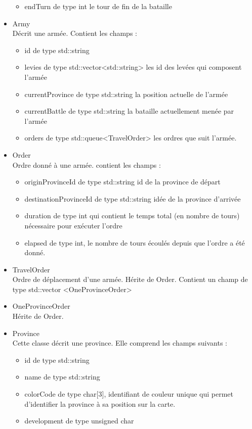 \documentclass[a4paper,12pt]{article}
\begin{document}
\begin{itemize}
\begin{itemize}
\item endTurn de type int le tour de fin de la bataille
\end{itemize}
\item Army\\
Décrit une armée. Contient les champs : 
\begin{itemize}
\item id de type std::string
\item levies de type std::vector<std::string> les id des levées qui composent l'armée
\item currentProvince de type std::string la position actuelle de l'armée
\item currentBattle de type std::string la bataille actuellement menée par l'armée
\item orders de type std::queue<TravelOrder> les ordres que suit l'armée.
\end{itemize}
\item Order\\
Ordre donné à une armée. contient les champs :
\begin{itemize}
 \item originProvinceId de type std::string id de la province de départ
 \item destinationProvinceId de type std::string idée de la province d'arrivée
 \item duration de type int qui contient le temps total (en nombre de tours) nécessaire pour exécuter l'ordre
 \item elapsed de type int, le nombre de tours écoulés depuis que l'ordre a été donné.
 \end{itemize}
\item TravelOrder\\
Ordre de déplacement d'une armée. Hérite de Order. Contient un champ de type std::vector <OneProvinceOrder> 
\item OneProvinceOrder\\
Hérite de Order.
\item Province\\
Cette classe décrit une province. Elle comprend les champs suivants :
\begin{itemize}
\item id de type std::string
\item name de type std::string
\item colorCode de type char[3], identifiant de couleur unique qui permet d'identifier la province à sa position sur la carte.
\item development de type unsigned char

\end{itemize}
\end{itemize}
\end{document}
